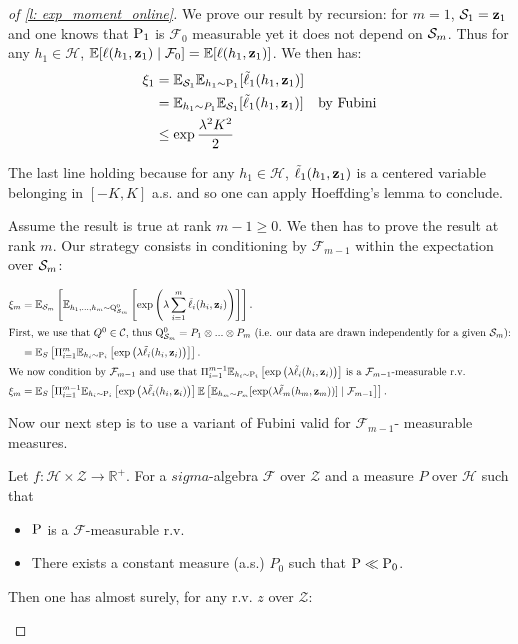 \begin{proof}[of \cref{l: exp_moment_online}]
  We prove our result by recursion: for $m=1$, $\S_1={\z_1}$ and one knows that $\P_1$ is $\mathcal{F}_0$ measurable yet it does not depend on $\Sm$. Thus for any $h_1\in\mathcal{H}$, $\mathbb{E}[\ell(h_1,\z_1)\mid \mathcal{F}_{0}]= \mathbb{E}[\ell(h_1,\z_1)]$. We then has:
  \begin{align*}
    \xi_1 &= \mathbb{E}_{\S_1}\mathbb{E}_{h_1\sim \P_1} [\Tilde{\ell}_1(h_1,\z_1)]\\
    &= \mathbb{E}_{h_1\sim P_1} \mathbb{E}_{\S_1} [\Tilde{\ell}_1(h_1,\z_1)] & \text{by Fubini} \\
    & \leq \exp{\frac{\lambda^2K^2}{2}}
  \end{align*}

The last line  holding because for any $h_1\in\mathcal{H}$, $\Tilde{\ell}_1(h_1,\z_1)$ is a centered variable belonging in $[-K,K]$ a.s. and so one can apply Hoeffding's lemma to conclude.


\noindent Assume the result is true at rank $m-1\geq 0$. We then has to prove the result at rank $m$. Our strategy consists in conditioning by $\mathcal{F}_{m-1}$ within the expectation over $\Sm$:

\begin{align*}
  \xi_m & = \mathbb{E}_{\Sm}\left[\mathbb{E}_{h_1,...,h_m \sim \Q_{\Sm}^0} \left[\exp\left(\lambda \sum_{i=1}^m \Tilde{\ell}_i(h_i,\z_i)\right)\right]\right].\\
  \intertext{First, we use that $Q^0\in\mathcal{C}$, thus $\Q_{\Sm}^0 = P_1\otimes...\otimes P_m$ (i.e. our data are drawn independently for a given $\Sm$):}
  &= \mathbb{E}_S\left[\Pi_{i=1}^m \mathbb{E}_{h_i \sim \P_{i}} \left[\exp\left(\lambda  \Tilde{\ell}_i(h_i,\z_i)\right)\right]\right].\\
  \intertext{We now condition by $\mathcal{F}_{m-1}$ and use that $\Pi_{i=1}^{m-1}\mathbb{E}_{h_i \sim \P_{i}} \left[\exp\left(\lambda  \Tilde{\ell}_i(h_i,\z_i)\right)\right]$ is a $\mathcal{F}_{m-1}$-measurable r.v.}
  \xi_m & = \mathbb{E}_S\left[ \Pi_{i=1}^{m-1}\mathbb{E}_{h_i \sim \P_{i}} \left[\exp\left(\lambda  \Tilde{\ell}_i(h_i,\z_i)\right)\right] \mathbb{E}
\left[ \mathbb{E}_{h_m\sim P_m} [\exp(\lambda \Tilde{\ell}_m(h_m,\z_m))] \mid \mathcal{F}_{m-1} \right] \right].
\end{align*}

Now our next step is to use a variant of Fubini valid for $\mathcal{F}_{m-1}$- measurable measures.

\begin{lemma}
  \label{l: cond_fubini-chap3}
  Let $f: \mathcal{H}\times \mathcal{Z} \rightarrow \mathbb{R}^+$.
  For a $sigma$-algebra $\mathcal{F}$ over $\mathcal{Z}$ and a measure $P$ over $\mathcal{H}$ such that
  \begin{itemize}
    \item $\P$ is a $\mathcal{F}$-measurable r.v.
    \item There exists a constant measure (a.s.) $P_0$ such that $\P\ll \P_0$.
  \end{itemize}
  Then one has almost surely, for any r.v. $z$ over $\mathcal{Z}$:


\end{lemma}
\end{proof}
